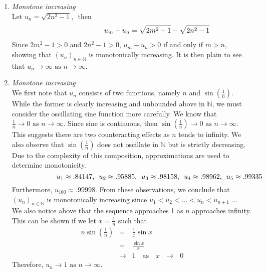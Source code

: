 \documentclass[12pt]{amsart}
\begin{document}
\begin{enumerate}
\begin{enumerate}
			\item \emph{Monotone increasing}\\
			
			Let $u_n  =  \sqrt{2n^2-1} \text{, } \text{ then}$ 
				\begin{eqnarray}
					\hspace{2.5cm} u_m - u_n  =  \sqrt{2m^2-1} - \sqrt{2n^2-1}  \nonumber
				\end{eqnarray}
			Since $2m^2-1>0$ and $2n^2-1>0$, $u_m-u_n >0$ if and only if $m>n$, showing that 
			$(u_n)_{n\in\mathbb{N}}$ is monotonically increasing.  It is then plain to see that $u_n 
			\rightarrow \infty \text { as } n \rightarrow \infty$.\\
					
			\item	\emph{Monotone increasing}\\		
			We first note that $u_n$ consists of two functions, namely $n$ and $\sin\left(\frac{1}{n}\right)$.  
			While the former is clearly increasing and unbounded above in $\mathbb{N}$, we must 					consider the oscillating sine function more carefully.  We know that $\frac{1}{n} \rightarrow 0 
			\text{ as } n \rightarrow \infty$.  Since sine is continuous, then 
			$\sin\left(\frac{1}{n}\right) \rightarrow 0 \text{ as } n \rightarrow \infty$. This suggests 	there are				two counteracting effects as $n$ tends to infinity.  We also observe that 
			$\sin\left(\frac{1}{n}\right)$ does not oscillate in $\mathbb{N}$ but is strictly decreasing. Due to 			the complexity of this composition, approximations are used to determine monotonicity.
			$$\hspace{2.2cm} u_1 \approx .84147 \text{, } \text{ } u_2 \approx .95885 \text{, } \text{ } 
			u_3 \approx .98158 \text{, } \text{ } u_4 \approx .98962 \text{, } \text{ } u_5 \approx.99335$$
			Furthermore, $u_{100} \approx .99998$.  From these observations, we conclude that
			$(u_n)_{n \in \mathbb{N}}$ is monotonically increasing since $u_1<u_2<...<u_n<u_{n+1}
			\text{ ...}$\\
			We also notice above that the sequence approaches 1 as $n$ approaches infinity. This can
			be shown 	if we let $x=\frac{1}{n}$ such that
				\begin{eqnarray}
					n\sin\left(\frac{1}{n}\right) & = & \frac{1}{x} \sin x \nonumber \\
					& = & \frac{\sin x}{x} \nonumber \\
					& \longrightarrow & 1 \text{  } \text{ as } \text{  } x \text{  } \longrightarrow \text{  } 0 						\nonumber
				\end{eqnarray}
			Therefore, $u_n \rightarrow 1 \text{ as } n \rightarrow \infty$.
									

\end{enumerate}
\end{enumerate}
\end{document}
